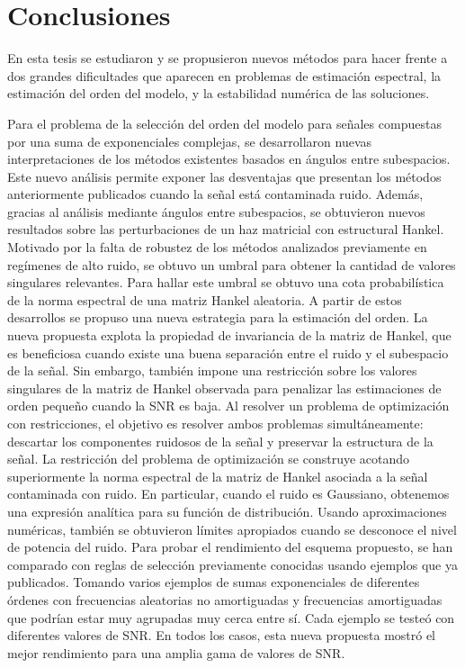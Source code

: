 \chapter{Conclusiones}\label{chap:conclusiones}

En esta tesis se estudiaron y se propusieron nuevos métodos para hacer frente a dos grandes dificultades que aparecen en problemas de estimación espectral, la estimación del orden del modelo, y la estabilidad numérica de las soluciones.

Para  el problema de la selección del orden del modelo para señales compuestas por una suma de exponenciales complejas, se desarrollaron nuevas interpretaciones de los métodos existentes basados en ángulos entre subespacios. Este nuevo análisis permite exponer las desventajas que presentan los métodos anteriormente publicados cuando la señal está contaminada ruido. Además, gracias al análisis mediante ángulos entre subespacios, se obtuvieron nuevos resultados sobre las perturbaciones de un haz matricial con estructural Hankel. Motivado por la falta de robustez de los métodos analizados previamente en regímenes de alto ruido, se obtuvo un umbral para obtener la cantidad de valores singulares relevantes. Para hallar este umbral se obtuvo una cota probabilística de la norma espectral de una matriz Hankel aleatoria. A partir de estos desarrollos se propuso una nueva estrategia para la estimación del orden. La nueva propuesta explota la propiedad de invariancia de la matriz de Hankel, que es beneficiosa cuando existe una buena separación entre el ruido y el subespacio de la señal. Sin embargo, también impone una restricción sobre los valores singulares de la matriz de Hankel observada para penalizar las estimaciones de orden pequeño cuando la SNR es baja. Al resolver un problema de optimización con restricciones, el objetivo es resolver ambos problemas simultáneamente: descartar los componentes ruidosos de la señal y preservar la estructura de la señal. La restricción del problema de optimización se construye acotando superiormente la norma espectral de la matriz de Hankel asociada a la señal contaminada con ruido. En particular, cuando el ruido es Gaussiano, obtenemos una expresión analítica para su función de distribución. Usando aproximaciones numéricas, también se obtuvieron límites apropiados cuando se desconoce el nivel de potencia del ruido. Para probar el rendimiento del esquema propuesto, se han comparado con reglas de selección previamente conocidas usando ejemplos que ya publicados. Tomando varios ejemplos de sumas exponenciales de diferentes órdenes con frecuencias aleatorias no amortiguadas y frecuencias amortiguadas que podrían estar muy agrupadas muy cerca entre sí. Cada ejemplo se testeó con diferentes valores de SNR. En todos los casos, esta nueva propuesta mostró el mejor rendimiento para una amplia gama de valores de SNR.

